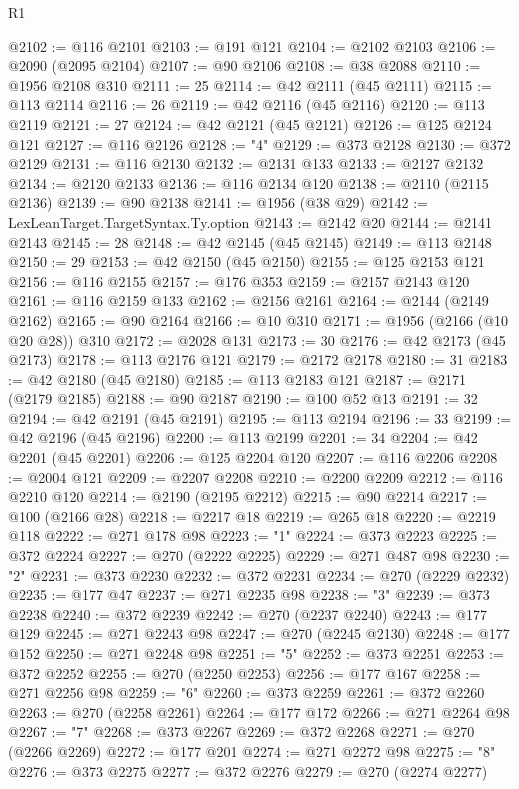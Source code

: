 \begin{lexlean}{R1}
\begin{coremodule}
@2102 := @116 @2101
@2103 := @191 @121
@2104 := @2102 @2103
@2106 := @2090 (@2095 @2104)
@2107 := @90 @2106
@2108 := @38 @2088
@2110 := @1956 @2108 @310
@2111 := 25
@2114 := @42 @2111 (@45 @2111)
@2115 := @113 @2114
@2116 := 26
@2119 := @42 @2116 (@45 @2116)
@2120 := @113 @2119
@2121 := 27
@2124 := @42 @2121 (@45 @2121)
@2126 := @125 @2124 @121
@2127 := @116 @2126
@2128 := "4"
@2129 := @373 @2128
@2130 := @372 @2129
@2131 := @116 @2130
@2132 := @2131 @133
@2133 := @2127 @2132
@2134 := @2120 @2133
@2136 := @116 @2134 @120
@2138 := @2110 (@2115 @2136)
@2139 := @90 @2138
@2141 := @1956 (@38 @29)
@2142 := LexLeanTarget.TargetSyntax.Ty.option
@2143 := @2142 @20
@2144 := @2141 @2143
@2145 := 28
@2148 := @42 @2145 (@45 @2145)
@2149 := @113 @2148
@2150 := 29
@2153 := @42 @2150 (@45 @2150)
@2155 := @125 @2153 @121
@2156 := @116 @2155
@2157 := @176 @353
@2159 := @2157 @2143 @120
@2161 := @116 @2159 @133
@2162 := @2156 @2161
@2164 := @2144 (@2149 @2162)
@2165 := @90 @2164
@2166 := @10 @310
@2171 := @1956 (@2166 (@10 @20 @28)) @310
@2172 := @2028 @131
@2173 := 30
@2176 := @42 @2173 (@45 @2173)
@2178 := @113 @2176 @121
@2179 := @2172 @2178
@2180 := 31
@2183 := @42 @2180 (@45 @2180)
@2185 := @113 @2183 @121
@2187 := @2171 (@2179 @2185)
@2188 := @90 @2187
@2190 := @100 @52 @13
@2191 := 32
@2194 := @42 @2191 (@45 @2191)
@2195 := @113 @2194
@2196 := 33
@2199 := @42 @2196 (@45 @2196)
@2200 := @113 @2199
@2201 := 34
@2204 := @42 @2201 (@45 @2201)
@2206 := @125 @2204 @120
@2207 := @116 @2206
@2208 := @2004 @121
@2209 := @2207 @2208
@2210 := @2200 @2209
@2212 := @116 @2210 @120
@2214 := @2190 (@2195 @2212)
@2215 := @90 @2214
@2217 := @100 (@2166 @28)
@2218 := @2217 @18
@2219 := @265 @18
@2220 := @2219 @118
@2222 := @271 @178 @98
@2223 := "1"
@2224 := @373 @2223
@2225 := @372 @2224
@2227 := @270 (@2222 @2225)
@2229 := @271 @487 @98
@2230 := "2"
@2231 := @373 @2230
@2232 := @372 @2231
@2234 := @270 (@2229 @2232)
@2235 := @177 @47
@2237 := @271 @2235 @98
@2238 := "3"
@2239 := @373 @2238
@2240 := @372 @2239
@2242 := @270 (@2237 @2240)
@2243 := @177 @129
@2245 := @271 @2243 @98
@2247 := @270 (@2245 @2130)
@2248 := @177 @152
@2250 := @271 @2248 @98
@2251 := "5"
@2252 := @373 @2251
@2253 := @372 @2252
@2255 := @270 (@2250 @2253)
@2256 := @177 @167
@2258 := @271 @2256 @98
@2259 := "6"
@2260 := @373 @2259
@2261 := @372 @2260
@2263 := @270 (@2258 @2261)
@2264 := @177 @172
@2266 := @271 @2264 @98
@2267 := "7"
@2268 := @373 @2267
@2269 := @372 @2268
@2271 := @270 (@2266 @2269)
@2272 := @177 @201
@2274 := @271 @2272 @98
@2275 := "8"
@2276 := @373 @2275
@2277 := @372 @2276
@2279 := @270 (@2274 @2277)

\end{coremodule}
\end{lexlean}
